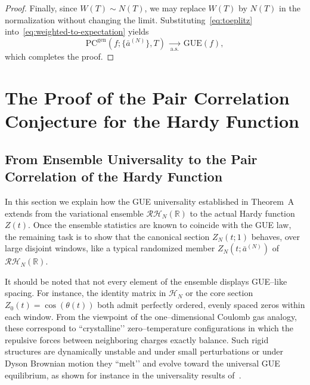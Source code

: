 \documentclass[12pt,reqno]{amsart}
\theoremstyle{plain}
\theoremstyle{definition}
\theoremstyle{remark}
\begin{document}
\begin{proof}
Finally, since $W(T)\sim N(T)$, we may replace $W(T)$ by $N(T)$ in the normalization without changing the limit.  
Substituting~\eqref{eq:toeplitz} into~\eqref{eq:weighted-to-expectation} yields
\begin{equation}
\mathrm{PC}^{\mathrm{gen}}(f;\{\bar a^{(N)}\},T)
\;\xrightarrow[\mathrm{a.s.}]{}\;
\mathrm{GUE}(f),
\end{equation}
which completes the proof.
\end{proof}


\newcommand{\PC}{\mathrm{PC}}
\newcommand{\one}{\overline{1}}
\newcommand{\I}{I}
\newcommand{\bfa}{\bar a}
\newcommand{\ip}[2]{\left\langle #1,\,#2\right\rangle}


\section{The Proof of the Pair Correlation Conjecture for the Hardy Function}
\label{s:9}

\subsection{From Ensemble Universality to the Pair Correlation of the Hardy Function}
In this section we explain how the GUE universality established in Theorem~A
extends from the variational ensemble $\mathcal{RH}_N(\mathbb{R})$ to the actual Hardy
function $Z(t)$. Once the ensemble statistics are known to coincide with the GUE law,
the remaining task is to show that the canonical section $Z_N(t;1)$ behaves, over large disjoint windows, like a typical randomized member $Z_N(t;\bar a^{(N)})$ of $\mathcal{RH}_N(\mathbb{R})$.  

It should be noted that not every element of the ensemble displays GUE--like spacing. For instance, 
the identity matrix in $\mathcal{H}_N$ or the core section $Z_0(t)=\cos(\theta(t))$ both admit perfectly ordered, evenly spaced zeros within each window.
From the viewpoint of the one--dimensional Coulomb gas analogy, these correspond to “crystalline’’ zero–temperature configurations in which the repulsive forces between neighboring charges exactly balance.
Such rigid structures are dynamically unstable and under small perturbations or under Dyson Brownian motion they “melt’’ and evolve toward the universal GUE equilibrium, as shown for instance in the universality results of~\cite{ErdosYau2012,BourgadeErdosYau2014}.  
\end{document}
